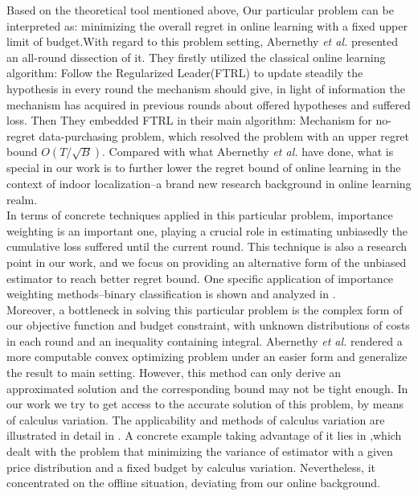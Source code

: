 \documentclass[10pt,conference,compsocconf,letterpaper]{IEEEtran}
\begin{document}
Based on the theoretical tool mentioned above, Our particular problem can be interpreted as: minimizing the overall regret in online learning with a fixed upper limit of budget.With regard to this problem setting, Abernethy \emph{et al.} presented an all-round dissection of it\cite{abernethy2015low}. They firstly utilized the classical online learning algorithm: Follow the Regularized Leader(FTRL) to update steadily the hypothesis in every round the mechanism should give, in light of information the mechanism has acquired in previous rounds about offered hypotheses and suffered loss. Then They embedded FTRL in their main algorithm: Mechanism for no-regret data-purchasing problem, which resolved the problem with an upper regret bound $O(T/\sqrt{B})$. Compared with what Abernethy \emph{et al.} have done\cite{abernethy2015low}, what is special in our work is to further lower the regret bound of online learning in the context of indoor localization--a brand new research background in online learning realm.\\
\indent In terms of concrete techniques applied in this particular problem, importance weighting is an important one, playing a crucial role in estimating unbiasedly the cumulative loss suffered until the current round\cite{abernethy2015low}. This technique is also a research point in our work, and we focus on providing an alternative form of the unbiased estimator to reach better regret bound. One specific application of importance weighting methods--binary classification is shown and analyzed in \cite{beygelzimer2009importance}.\\
\indent Moreover, a bottleneck in solving this particular problem is the complex form of our objective function and budget constraint, with unknown distributions of costs in each round and an inequality containing integral. Abernethy \emph{et al.} rendered a more computable convex optimizing problem\cite{abernethy2015low} under an easier form and generalize the result to  main setting. However, this method can only derive an approximated solution and the corresponding bound may not be tight enough. In our work we try to get access to the accurate solution of this problem, by means of calculus variation. The applicability and methods of calculus variation are illustrated in detail in \cite{liberzon2012calculus}  . A concrete example taking advantage of it lies in \cite{roth2012conducting},which dealt with the problem that minimizing the variance of estimator with a given price distribution and a fixed budget by calculus variation. Nevertheless, it concentrated on the offline situation, deviating from our online background.
\end{document}
